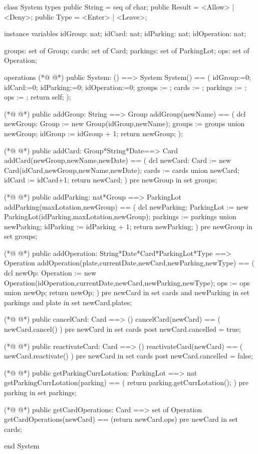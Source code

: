 \begin{vdmpp}[breaklines=true]
class System
types
public String = seq of char;
public Result = <Allow> | <Deny>;
public Type = <Enter> | <Leave>;

instance variables
idGroup: nat;
idCard: nat;
idParking: nat;
idOperation: nat;

groups: set of Group;
cards: set of Card;
parkings: set of ParkingLot;
ops: set of Operation;

operations
(*@
\label{System:19}
@*)
public System: () ==> System
 System() == (
  idGroup:=0;
  idCard:=0;
  idParking:=0;
  idOperation:=0;
  groups := {};
  cards := {};
  parkings := {};
  ops := {};
  return self;
 );
 
(*@
\label{addGroup:32}
@*)
public addGroup: String ==> Group
 addGroup(newName) == (
  dcl newGroup: Group := new Group(idGroup,newName);
  groups := groups union {newGroup};
  idGroup := idGroup + 1;
  return newGroup;
 );
 
(*@
\label{addCard:40}
@*)
public addCard: Group*String*Date==> Card
 addCard(newGroup,newName,newDate) == (
  dcl newCard: Card := new Card(idCard,newGroup,newName,newDate);
  cards := cards union {newCard};
  idCard := idCard+1;
  return newCard;
 )
 pre newGroup in set groups;
 
(*@
\label{addParking:49}
@*)
public addParking: nat*Group ==> ParkingLot
 addParking(maxLotation,newGroup) == (
  dcl newParking: ParkingLot := new ParkingLot(idParking,maxLotation,newGroup);
  parkings := parkings union {newParking};
  idParking := idParking + 1;
  return newParking;
 )
 pre newGroup in set groups;
 
(*@
\label{addOperation:58}
@*)
public addOperation: String*Date*Card*ParkingLot*Type ==> Operation
 addOperation(plate,currentDate,newCard,newParking,newType) == (
  dcl newOp: Operation := new Operation(idOperation,currentDate,newCard,newParking,newType);
  ops := ops union {newOp};
  return newOp;
 )
 pre newCard in set cards and newParking in set parkings and plate in set newCard.plates;
 
(*@
\label{cancelCard:66}
@*)
public cancelCard: Card ==> ()
 cancelCard(newCard) == (
  newCard.cancel()
 )
 pre newCard in set cards
 post newCard.cancelled = true;

(*@
\label{reactivateCard:73}
@*)
public reactivateCard: Card ==> ()
 reactivateCard(newCard) == (
  newCard.reactivate()
 )
 pre newCard in set cards
 post newCard.cancelled = false;

(*@
\label{getParkingCurrLotation:80}
@*)
public getParkingCurrLotation: ParkingLot ==> nat
 getParkingCurrLotation(parking) == (
  return parking.getCurrLotation();
 )
 pre parking in set parkings;
 
(*@
\label{getCardOperations:86}
@*)
public getCardOperations: Card ==> set of Operation
 getCardOperations(newCard) == (return newCard.ops)
 pre newCard in set cards;

end System
\end{vdmpp}
